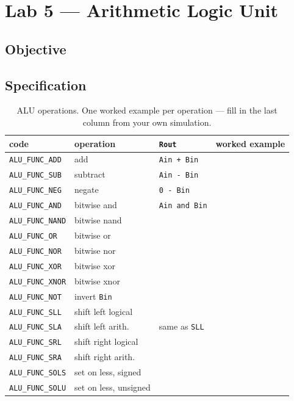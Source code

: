 
\chapter{Lab 5 --- Arithmetic Logic Unit}

\section{Objective}

\section{Specification}

\begin{table}[htbp]
\centering
\caption{ALU operations. One worked example per operation --- fill in the last
column from your own simulation.}
\label{tab:lab05-ops}
\begin{tabular}{lll@{\hskip 10pt}l}
\toprule
code & operation & \texttt{Rout} & worked example \\
\midrule
\texttt{ALU\_FUNC\_ADD}  & add                & \texttt{Ain + Bin}   & \\
\texttt{ALU\_FUNC\_SUB}  & subtract           & \texttt{Ain - Bin}   & \\
\texttt{ALU\_FUNC\_NEG}  & negate             & \texttt{0 - Bin}     & \\
\texttt{ALU\_FUNC\_AND}  & bitwise and        & \texttt{Ain and Bin} & \\
\texttt{ALU\_FUNC\_NAND} & bitwise nand       &                      & \\
\texttt{ALU\_FUNC\_OR}   & bitwise or         &                      & \\
\texttt{ALU\_FUNC\_NOR}  & bitwise nor        &                      & \\
\texttt{ALU\_FUNC\_XOR}  & bitwise xor        &                      & \\
\texttt{ALU\_FUNC\_XNOR} & bitwise xnor       &                      & \\
\texttt{ALU\_FUNC\_NOT}  & invert \texttt{Bin} &                     & \\
\texttt{ALU\_FUNC\_SLL}  & shift left logical &                      & \\
\texttt{ALU\_FUNC\_SLA}  & shift left arith.  & same as \texttt{SLL} & \\
\texttt{ALU\_FUNC\_SRL}  & shift right logical &                     & \\
\texttt{ALU\_FUNC\_SRA}  & shift right arith. &                      & \\
\texttt{ALU\_FUNC\_SOLS} & set on less, signed &                     & \\
\texttt{ALU\_FUNC\_SOLU} & set on less, unsigned &                   & \\
\bottomrule
\end{tabular}
\end{table}

